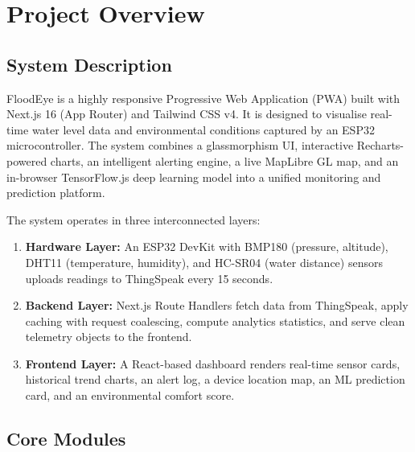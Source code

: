 \chapter{Project Overview}

\section{System Description}

FloodEye is a highly responsive Progressive Web Application (PWA) built with Next.js 16 (App Router) and Tailwind CSS v4. It is designed to visualise real-time water level data and environmental conditions captured by an ESP32 microcontroller. The system combines a glassmorphism UI, interactive Recharts-powered charts, an intelligent alerting engine, a live MapLibre GL map, and an in-browser TensorFlow.js deep learning model into a unified monitoring and prediction platform.

The system operates in three interconnected layers:

\begin{enumerate}[leftmargin=1.5em]
  \item \textbf{Hardware Layer:} An ESP32 DevKit with BMP180 (pressure, altitude), DHT11 (temperature, humidity), and HC-SR04 (water distance) sensors uploads readings to ThingSpeak every 15 seconds.
  \item \textbf{Backend Layer:} Next.js Route Handlers fetch data from ThingSpeak, apply caching with request coalescing, compute analytics statistics, and serve clean telemetry objects to the frontend.
  \item \textbf{Frontend Layer:} A React-based dashboard renders real-time sensor cards, historical trend charts, an alert log, a device location map, an ML prediction card, and an environmental comfort score.
\end{enumerate}

\section{Core Modules}

